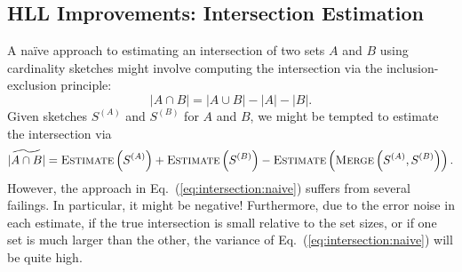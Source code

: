\documentclass{report}
\newcommand{\algoname}[1]{\textnormal{\textsc{#1}}}
\begin{document}
\subsection{\algoname{HLL} Improvements: Intersection Estimation}
 \label{DS:sec:HLL:intersection}

A na\"ive approach to estimating an intersection of two sets $A$ and $B$ using cardinality sketches might involve computing the intersection via the inclusion-exclusion principle:
%
\begin{equation} \label{eq:inclusion-exclusion}
	|A \cap B| = |A \cup B| - |A| - |B|.
\end{equation}
%
Given sketches $S^{(A)}$ and $S^{(B)}$ for $A$ and $B$, we might be tempted to estimate the intersection via
%
\begin{equation} \label{eq:intersection:naive}
	\widetilde{|A \cap B|} 
	= \algoname{Estimate} \left ( S^{(A)} \right ) 
	+ \algoname{Estimate} \left ( S^{(B)} \right ) 
	- \algoname{Estimate} \left ( \algoname{Merge} \left ( S^{(A)}, S^{(B)} \right ) \right ).
\end{equation}
%
However, the approach in Eq.~(\ref{eq:intersection:naive}) suffers from several failings.
In particular, it might be negative!
Furthermore, due to the error noise in each estimate, if the true intersection is small relative to the set sizes, or if one set is much larger than the other, the variance of Eq.~(\ref{eq:intersection:naive}) will be quite high.
\end{document}
